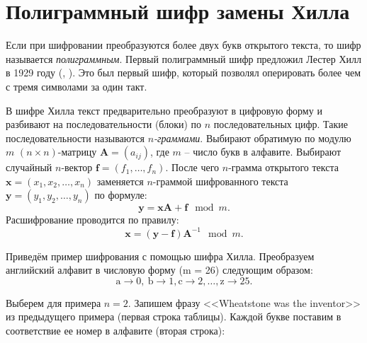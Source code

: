 \section{Полиграммный шифр замены Хилла}

Если при шифровании преобразуются более двух букв открытого текста, то шифр называется \emph{полиграммным}. Первый полиграммный шифр предложил Лестер Хилл в 1929 году (, \cite{Hill:1929, Hill:1931}). Это был первый шифр, который позволял оперировать более чем с тремя символами за один такт.

В шифре Хилла текст предварительно преобразуют в цифровую форму и разбивают на последовательности (блоки) по $n$ последовательных цифр. Такие последовательности называются \emph{$n$-граммами}. Выбирают обратимую по модулю $m$  $(n \times n)$-матрицу $\mathbf{A} = (a_{ij})$, где  $m$ -- число букв в алфавите. Выбирают случайный $n$-вектор $\mathbf{f} = (f_1,  \dots, f_n)$. После чего  $n$-грамма открытого текста $\mathbf{x} = (x_1, x_2,  \dots, x_n)$ заменяется $n$-граммой шифрованного текста $\mathbf{y} = (y_1, y_2,  \dots, y_n)$ по формуле:
    \[ \mathbf{y} = \mathbf{x} \mathbf{A} + \mathbf{f} \mod m. \]
Расшифрование проводится по правилу:
    \[ \mathbf{x} = (\mathbf{y} - \mathbf{f}) \mathbf{A}^{-1} \mod m. \]

\example
Приведём пример шифрования с помощью шифра Хилла. Преобразуем английский алфавит в числовую форму (m = 26) следующим образом:
\[ \text{a} \rightarrow 0, ~ \text{b} \rightarrow 1, \text{c} \rightarrow 2, \dots, \text{z} \rightarrow 25. \]

Выберем для примера $n=2$. Запишем фразу <<Wheatstone was the inventor>> из предыдущего примера (первая строка таблицы). Каждой букве поставим в соответствие ее номер в алфавите (вторая строка):
\begin{center}  \end{center}

